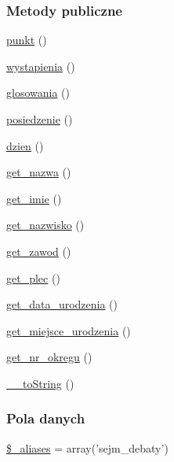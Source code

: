 \subsubsection*{Metody publiczne}
\begin{DoxyCompactItemize}
\item 
\hyperlink{classep___sejm___posiedzenie___debata_a33d6419a012729a56ab84c223a587ee2}{punkt} ()
\item 
\hyperlink{classep___sejm___posiedzenie___debata_a18b1bf1c04262c23e5edc5c81a4f897c}{wystapienia} ()
\item 
\hyperlink{classep___sejm___posiedzenie___debata_a053e53f5c6126e89ed49774ba8f12ec9}{glosowania} ()
\item 
\hyperlink{classep___sejm___posiedzenie___debata_abfdc29f0533665ad6c77341c5fa3f7c7}{posiedzenie} ()
\item 
\hyperlink{classep___sejm___posiedzenie___debata_a211a968a9f3aa1e4a58516f8c344ec00}{dzien} ()
\item 
\hyperlink{classep___sejm___posiedzenie___debata_ac0818f0049d7b84f08f77128f54cee36}{get\-\_\-nazwa} ()
\item 
\hyperlink{classep___sejm___posiedzenie___debata_ac4b0c85dc2a130038f2d118dbd0c3d77}{get\-\_\-imie} ()
\item 
\hyperlink{classep___sejm___posiedzenie___debata_abdd1d7ff92508da7f748ba1feec97af0}{get\-\_\-nazwisko} ()
\item 
\hyperlink{classep___sejm___posiedzenie___debata_af80ca8310b60004454dd02a387deaa2c}{get\-\_\-zawod} ()
\item 
\hyperlink{classep___sejm___posiedzenie___debata_ac7f9af5c3fa024e4c26a7b6bd4ce4bb4}{get\-\_\-plec} ()
\item 
\hyperlink{classep___sejm___posiedzenie___debata_a880b240cd2d8c336fd1709bf0cb1ae2c}{get\-\_\-data\-\_\-urodzenia} ()
\item 
\hyperlink{classep___sejm___posiedzenie___debata_ac57c08ec5e394a19c5bd9280c8376182}{get\-\_\-miejsce\-\_\-urodzenia} ()
\item 
\hyperlink{classep___sejm___posiedzenie___debata_a2645a9f0aa5b0ccc482943348c033d0a}{get\-\_\-nr\-\_\-okregu} ()
\item 
\hyperlink{classep___sejm___posiedzenie___debata_a7516ca30af0db3cdbf9a7739b48ce91d}{\-\_\-\-\_\-to\-String} ()
\end{DoxyCompactItemize}
\subsubsection*{Pola danych}
\begin{DoxyCompactItemize}
\item 
\hyperlink{classep___sejm___posiedzenie___debata_ab4e31d75f0bc5d512456911e5d01366b}{\$\-\_\-aliases} = array('sejm\-\_\-debaty')
\end{DoxyCompactItemize}

